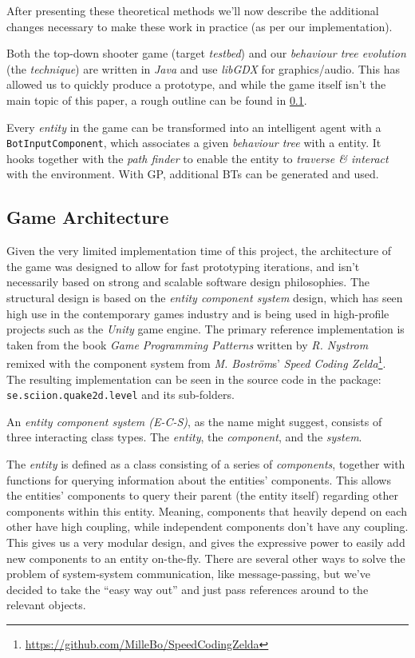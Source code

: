 \documentclass[a4paper, twocolumn]{article}
\begin{document}
        After presenting these theoretical methods we'll now describe the additional changes necessary to make these work in practice (as per our implementation).

        Both the top-down shooter game (target \emph{testbed}) and our \emph{behaviour tree evolution} (the \emph{technique}) are written in \emph{Java} and use \emph{libGDX} for graphics/audio. This has allowed us to quickly produce a prototype, and while the game itself isn't the main topic of this paper, a rough outline can be found in \cref{sec:game_architecture}.

        Every \emph{entity} in the game can be transformed into an intelligent agent with a \texttt{BotInputComponent}, which associates a given \emph{behaviour tree} with a entity. It hooks together with the \emph{path finder} to enable the entity to \emph{traverse \& interact} with the environment. With GP, additional BTs can be generated and used.

        \subsection{Game Architecture} \label{sec:game_architecture}

        Given the very limited implementation time of this project, the architecture of the game was designed to allow for fast prototyping iterations, and isn't necessarily based on strong and scalable software design philosophies. The structural design is based on the \textit{entity component system} design, which has seen high use in the contemporary games industry and is being used in high-profile projects such as the \textit{Unity} game engine. The primary reference implementation is taken from the book \textit{Game Programming Patterns} written by \textit{R. Nystrom}~\cite{nystrom2014game} remixed with the component system from \textit{M. Boström}s' \textit{Speed Coding Zelda}\footnote{\url{https://github.com/MilleBo/SpeedCodingZelda}}. The resulting implementation can be seen in the source code in the package: \texttt{se.sciion.quake2d.level} and its sub-folders.

        An \textit{entity component system (E-C-S)}, as the name might suggest, consists of three interacting class types. The \textit{entity}, the \textit{component}, and the \textit{system}.

        The \emph{entity} is defined as a class consisting of a series of \emph{components}, together with functions for querying information about the entities' components. This allows the entities' components to query their parent (the entity itself) regarding other components within this entity. Meaning, components that heavily depend on each other have high coupling, while independent components don't have any coupling. This gives us a very modular design, and gives the expressive power to easily add new components to an entity on-the-fly. There are several other ways to solve the problem of system-system communication, like message-passing, but we've decided to take the ``easy way out'' and just pass references around to the relevant objects.
\end{document}
